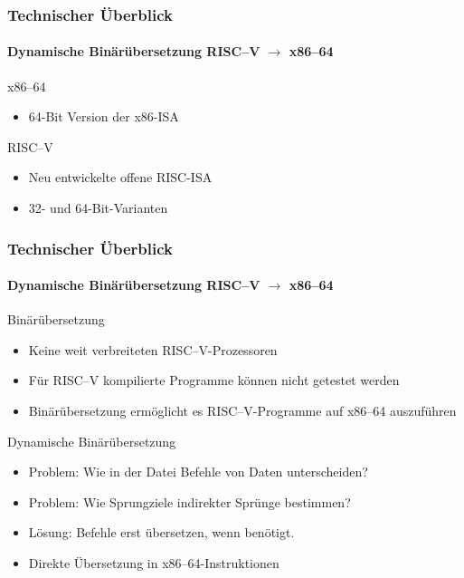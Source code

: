 \documentclass[aspectratio=169, sectionpage=false, german]{tumbeamer}
\newcommand{\refer}[0]{\ensuremath{\rightarrow} }
\begin{document}
\begin{frame}
	\frametitle{Technischer Überblick}

	\framesubtitle {Dynamische Binärübersetzung RISC--V \refer x86--64}

	\begin{block}{x86--64}
		\begin{itemize}
			\item 64-Bit Version der x86-ISA
		\end{itemize}
	\end{block}

	\vspace{1cm}

	\begin{block}{RISC--V}
		\begin{itemize}
			\item Neu entwickelte offene RISC-ISA
			\item 32- und 64-Bit-Varianten
		\end{itemize}
	\end{block}
\end{frame}
\begin{frame}
	\frametitle{Technischer Überblick}

	\framesubtitle {Dynamische Binärübersetzung RISC--V \refer x86--64}

	\begin{block}{Binärübersetzung}
		\begin{itemize}
			\item Keine weit verbreiteten RISC--V-Prozessoren
			\item Für RISC--V kompilierte Programme können nicht getestet werden
			\item Binärübersetzung ermöglicht es RISC--V-Programme auf x86--64 auszuführen
		\end{itemize}
	\end{block}
	\begin{block}{Dynamische Binärübersetzung}
		\begin{itemize}
			\item Problem: Wie in der Datei Befehle von Daten unterscheiden?
			\item Problem: Wie Sprungziele indirekter Sprünge bestimmen?
			\item Lösung: Befehle erst übersetzen, wenn benötigt.
			\item Direkte Übersetzung in x86--64-Instruktionen
		\end{itemize}
	\end{block}
\end{frame}
\end{document}
